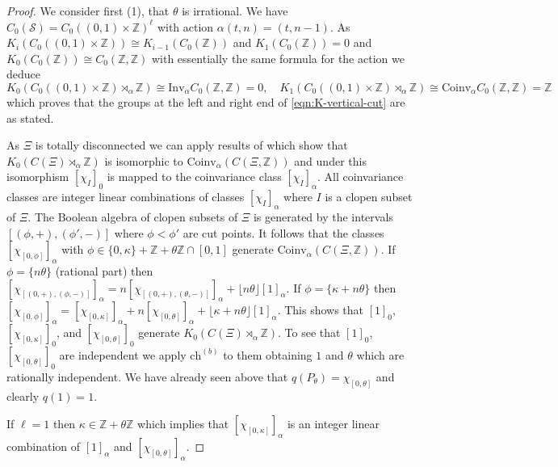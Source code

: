 \documentclass[11pt]{amsart}
\newcommand{\Z}{\mathbb{Z}}
\newcommand{\cut}{\kappa}
\newcommand{\chb}{\text{ch}^{(b)}}
\newcommand{\Ss}{\mathcal{S}}
\begin{document}
\begin{proof} We consider first (1), that $\theta$ is irrational. 
We have $C_0(\Ss)=C_0((0,1)\times \Z)^\ell$ with action $\alpha(t,n) = (t,n-1)$. As $K_i(C_0((0,1)\times \Z)) \cong K_{i-1}(C_0(\Z))$
and  $K_{1}(C_0(\Z)) = 0$ and $K_{0}(C_0(\Z)) \cong C_0(\Z,\Z)$ with essentially the same formula for the action we deduce
$$K_0(C_0((0,1)\times \Z)\rtimes_\alpha\Z) \cong \mathrm{Inv}_\alpha C_0(\Z,\Z) = 0,\quad
K_1(C_0((0,1)\times \Z)\rtimes_\alpha\Z) \cong \mathrm{Coinv}_\alpha C_0(\Z,\Z) = \Z$$
which proves that the groups at the left and right end of \eqref{eqn:K-vertical-cut} are as stated.

As $\Xi$ is totally disconnected we can apply results of \cite{Bellissard1992} which show that $K_0(C(\Xi) \rtimes_\alpha \mathbb{Z})$ is isomorphic to $\mathrm{Coinv}_{\alpha}(C(\Xi,\Z))$ and under this isomorphism $[\chi_I]_0$ is mapped to the coinvariance class $[\chi_I]_\alpha$. All coinvariance classes are integer linear combinations of classes $[\chi_I]_\alpha$ where $I$ is a clopen subset of $\Xi$. The Boolean algebra of clopen subsets of $\Xi$ is generated by the intervals $[(\phi,+),(\phi',-)]$ where $\phi<\phi'$ are cut points.
It follows that the classes $[\chi_{[0,\phi]}]_\alpha$ 
		with $\phi\in \{0,\cut\}+\Z+\theta\Z\cap [0,1]$ generate $\mathrm{Coinv}_{\alpha}(C(\Xi,\Z))$. If $\phi = \{n\theta\}$ (rational part) then $[\chi_{[(0,+),(\phi,-)]}]_\alpha = n [\chi_{[(0,+),(\theta,-)]}]_\alpha + \lfloor n \theta \rfloor [1]_\alpha$. If $\phi = \{\cut+n\theta\}$ then $[\chi_{[0,\phi]}]_\alpha = [\chi_{[0,\cut]}]_\alpha + n [\chi_{[0,\theta]}]_\alpha + \lfloor \cut+ n \theta \rfloor [1]_\alpha$. This shows that $[1]_0$, $ [\chi_{[0,\cut]}]_0$, and $  [\chi_{[0,\theta]}]_0 $ generate $K_0(C(\Xi)\rtimes_\alpha\Z)$. To see that $[1]_0$, $ [\chi_{[0,\theta]}]_0$ are independent we apply $\chb$ to them obtaining $1$ and $\theta$ which are rationally independent. We have already seen above that $q(P_\theta) = \chi_{[0,\theta]}$ and clearly $q(1)=1$.

If $\ell = 1$ then $\cut\in \Z+\theta\Z$ which implies that   $[\chi_{[0,\cut]}]_\alpha$ is an integer linear combination of $[1]_\alpha$ and $  [\chi_{[0,\theta]}]_\alpha $. 


\end{proof}
\end{document}
